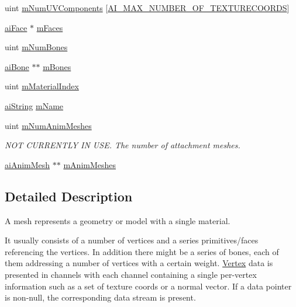 \begin{DoxyCompactItemize}
\item 
uint \hyperlink{structassimp_1_1mesh_1_1ai_mesh_aa0fe74d498ea8118b8d628a30b63d4d3}{m\+Num\+U\+V\+Components} \mbox{[}\hyperlink{namespaceassimp_1_1mesh_a3a8dfbb9ee6186e1d78d2a8dfa909a10}{A\+I\+\_\+\+M\+A\+X\+\_\+\+N\+U\+M\+B\+E\+R\+\_\+\+O\+F\+\_\+\+T\+E\+X\+T\+U\+R\+E\+C\+O\+O\+R\+D\+S}\mbox{]}
\item 
\hyperlink{structassimp_1_1mesh_1_1ai_face}{ai\+Face} $\ast$ \hyperlink{structassimp_1_1mesh_1_1ai_mesh_a522ce4afe9b6e0d0b5df209e620b76ba}{m\+Faces}
\item 
uint \hyperlink{structassimp_1_1mesh_1_1ai_mesh_a18532474ca4579a63506507ab4600c26}{m\+Num\+Bones}
\item 
\hyperlink{structassimp_1_1mesh_1_1ai_bone}{ai\+Bone} $\ast$$\ast$ \hyperlink{structassimp_1_1mesh_1_1ai_mesh_a5148269d290966a3895593009ef619a0}{m\+Bones}
\item 
uint \hyperlink{structassimp_1_1mesh_1_1ai_mesh_ac5ac01d7d9c915de71c2c80338db9901}{m\+Material\+Index}
\item 
\hyperlink{structassimp_1_1types_1_1ai_string}{ai\+String} \hyperlink{structassimp_1_1mesh_1_1ai_mesh_a3ffa3325c59b7ab92e4743862d47b70f}{m\+Name}
\item 
\hypertarget{structassimp_1_1mesh_1_1ai_mesh_adfa53445525c03a6973e7c8df0c59be5}{uint \hyperlink{structassimp_1_1mesh_1_1ai_mesh_adfa53445525c03a6973e7c8df0c59be5}{m\+Num\+Anim\+Meshes}}\label{structassimp_1_1mesh_1_1ai_mesh_adfa53445525c03a6973e7c8df0c59be5}

\begin{DoxyCompactList}\small\item\em N\+O\+T C\+U\+R\+R\+E\+N\+T\+L\+Y I\+N U\+S\+E. The number of attachment meshes. \end{DoxyCompactList}\item 
\hyperlink{structassimp_1_1mesh_1_1ai_anim_mesh}{ai\+Anim\+Mesh} $\ast$$\ast$ \hyperlink{structassimp_1_1mesh_1_1ai_mesh_a0ef0cdda627aca52178b73ec25d58a82}{m\+Anim\+Meshes}
\end{DoxyCompactItemize}


\subsection{Detailed Description}
A mesh represents a geometry or model with a single material.

It usually consists of a number of vertices and a series primitives/faces referencing the vertices. In addition there might be a series of bones, each of them addressing a number of vertices with a certain weight. \hyperlink{struct_vertex}{Vertex} data is presented in channels with each channel containing a single per-\/vertex information such as a set of texture coords or a normal vector. If a data pointer is non-\/null, the corresponding data stream is present.

